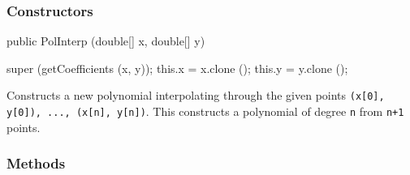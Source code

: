 \subsubsection* {Constructors}
\begin{code}

   public PolInterp (double[] x, double[] y)\begin{hide} {
      super (getCoefficients (x, y));
      this.x = x.clone ();
      this.y = y.clone ();
   }\end{hide}
\end{code}
\begin{tabb}   Constructs a new polynomial interpolating through the given points
 \texttt{(x[0], y[0]), ..., (x[n], y[n])}. This constructs a polynomial of
 degree \texttt{n} from \texttt{n+1} points.
\end{tabb}
\begin{htmlonly}
\end{htmlonly}

\subsubsection* {Methods}

